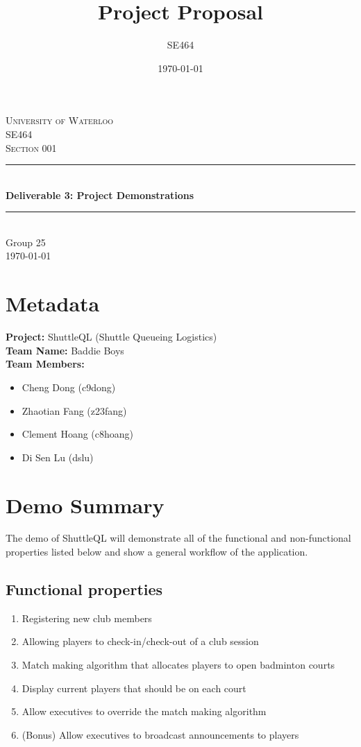 \documentclass{article}
\title{Project Proposal}
\author{SE464}
\date{\today}
\begin{document}
\begin{titlepage}
\newcommand{\HRule}{\rule{\linewidth}{0.5mm}}

\center

\textsc{\huge University of Waterloo}\\[3cm]
\textsc{\LARGE SE464}\\[1.5cm]
\textsc{\Large Section 001}\\[1.5cm]

\HRule \\[0.75cm]
{ \Huge \bfseries Deliverable 3: Project Demonstrations}\\[0.5cm]
\HRule \\[2cm]

\Large Group 25 \\  [8cm]

{\Large \today}\\

\vfill
\end{titlepage}

\section{Metadata}
\textbf{Project:} ShuttleQL (Shuttle Queueing Logistics) \\
\textbf{Team Name:} Baddie Boys \\
\textbf{Team Members:}
\begin{itemize}
  \item Cheng Dong (c9dong)
  \item Zhaotian Fang (z23fang)
  \item Clement Hoang (c8hoang)
  \item Di Sen Lu (dslu)
\end{itemize}

\section{Demo Summary}
The demo of ShuttleQL will demonstrate all of the functional and non-functional properties listed below and show a general workflow of the application.

\subsection{Functional properties}
\begin{enumerate}
  \item Registering new club members
  \item Allowing players to check-in/check-out of a club session
  \item Match making algorithm that allocates players to open badminton courts
  \item Display current players that should be on each court
  \item Allow executives to override the match making algorithm
  \item (Bonus) Allow executives to broadcast announcements to players
\end{enumerate}
\end{document}
